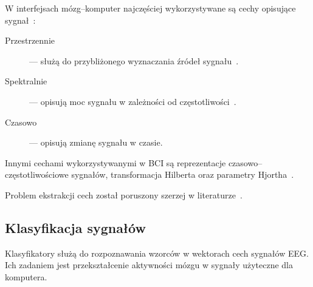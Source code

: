 \documentclass[skorowidz,skroty]{dyplomWEZUT}
\begin{document}
W interfejsach mózg--komputer najczęściej wykorzystywane są cechy opisujące sygnał~\cite{eeg_features}:
\begin{description}
    \item [Przestrzennie] --- służą do przybliżonego wyznaczania źródeł sygnału~\cite{eeg_features}.
    \item [Spektralnie] --- opisują moc sygnału w zależności od częstotliwości~\cite{bci_foundations}.
    \item [Czasowo] --- opisują zmianę sygnału w czasie.
\end{description}
Innymi cechami wykorzystywanymi w BCI są reprezentacje czasowo--czę\-sto\-tli\-wo\-ścio\-we sygnałów, transformacja Hilberta oraz parametry Hjortha~\cite{bci_robotics}.

Problem ekstrakcji cech został poruszony szerzej w literaturze~\cite{eeg_features,bci_foundations,bci_introduction,bci_robotics,bci_principles}.


\subsection{Klasyfikacja sygnałów}
Klasyfikatory służą do rozpoznawania wzorców w wektorach cech sygnałów EEG. Ich zadaniem jest przekształcenie aktywności mózgu w sygnały użyteczne dla komputera.
\end{document}
